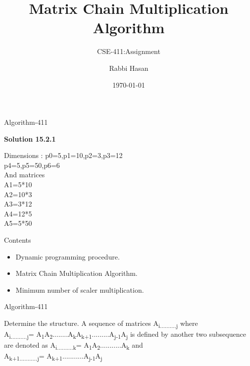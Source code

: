 \documentclass{beamer}
\begin{document}
\title{Matrix Chain Multiplication Algorithm}
\subtitle{CSE-411:Assignment }
\author{Rabbi Hasan}
\date{\today}

\begin{frame}
\titlepage
\end{frame}

 
\begin{frame}[t]{Algorithm-411}
\vspace{ 15 pt}
\begin{center} {\textbf{Solution 15.2.1}}

\end{center}
Dimensions : p0=5,p1=10,p2=3,p3=12\\p4=5,p5=50,p6=6\\
And matrices \\A1=5*10\\A2=10*3\\A3=3*12\\A4=12*5 \\A5=5*50

\end{frame}

\begin{frame}{Contents}
\begin{itemize}
\item Dynamic programming procedure.
\item Matrix Chain Multiplication Algorithm.
\item Minimum number of scaler multiplication.
\end{itemize}

\end{frame}

\begin{frame}[t]{Algorithm-411}
\vspace{15 pt}

\begin{block}{Determine the structure.}
\vspace{10pt}
 A sequence of matrices  A\textsubscript{i..........j} where\\ A\textsubscript{i..........j}= A\textsubscript{1}A\textsubscript{2}........A\textsubscript{k}A\textsubscript{k+1}.........A\textsubscript{j-1}A\textsubscript{j} is defined by another two subsequence are denoted as  A\textsubscript{i..........k}= A\textsubscript{1}A\textsubscript{2}...........A\textsubscript{k} and \\A\textsubscript{k+1...........j}=  A\textsubscript{k+1}...........A\textsubscript{j-1}A\textsubscript{j}\\

\end{block}
\end{frame}
\end{document}
